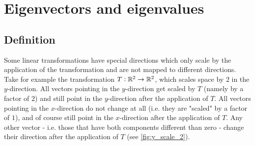 \section{Eigenvectors and eigenvalues}
\subsection{Definition}
Some linear transformations have special directions which only scale by the application of the transformation and are not mapped to different directions. Take for example the transformation $T:\Rs[2]\to\Rs[2]$, which scales space by $2$ in the $y$-direction. All vectors pointing in the $y$-direction get scaled by $T$ (namely by a factor of $2$) and still point in the $y$-direction after the application of $T$. All vectors pointing in the $x$-direction do not change at all (i.e. they are "scaled" by a factor of $1$), and of course still point in the $x$-direction after the application of $T$. Any other vector - i.e. those that have both components different than zero - change their direction after the application of $T$ (see \autoref{fig:y_scale_2}).

